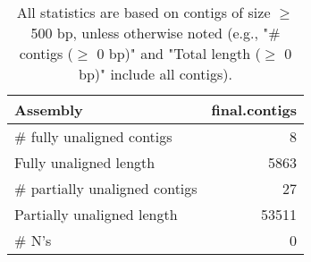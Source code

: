\documentclass[12pt,a4paper]{article}
\begin{document}
\begin{table}[ht]
\begin{center}
\caption{All statistics are based on contigs of size $\geq$ 500 bp, unless otherwise noted (e.g., "\# contigs ($\geq$ 0 bp)" and "Total length ($\geq$ 0 bp)" include all contigs).}
\begin{tabular}{|l*{1}{|r}|}
\hline
Assembly & final.contigs \\ \hline
\# fully unaligned contigs & 8 \\ \hline
Fully unaligned length & 5863 \\ \hline
\# partially unaligned contigs & 27 \\ \hline
Partially unaligned length & 53511 \\ \hline
\# N's & 0 \\ \hline
\end{tabular}
\end{center}
\end{table}
\end{document}
